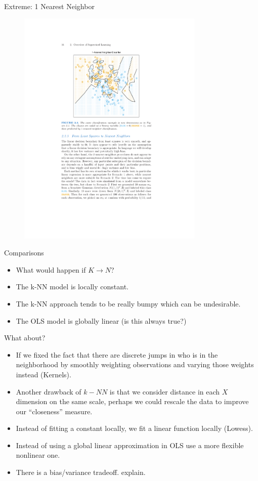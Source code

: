 \documentclass[11pt,handout,xcolor=pdftex,dvipsnames,table,mathserif]{beamer}
\begin{document}
\begin{frame}{Extreme: 1 Nearest Neighbor}
\begin{figure}[htbp]
\begin{center}
\includegraphics[width=3.5in]{./resources/classifier1nn.pdf}
\label{class15nn}
\end{center}
\end{figure}
\end{frame}

\begin{frame}{Comparisons}
\begin{itemize}
\item What would happen if $K \rightarrow N$?
\item The k-NN model is locally constant.
\item The k-NN approach tends to be really bumpy which can be undesirable.
\item The OLS model is globally linear (is this always true?)
\end{itemize}
\end{frame}
\begin{frame}{What about?}
\begin{itemize}
\item If we fixed the fact that there are discrete jumps in who is in the neighborhood by smoothly weighting observations and varying those weights instead (Kernels).
\item Another drawback of $k-NN$ is that we consider distance in each $X$ dimension on the same scale, perhaps we could rescale the data to improve our ``closeness'' measure.
\item Instead of fitting a constant locally, we fit a linear function locally (Lowess).
\item Instead of using a global linear approximation in OLS use a more flexible nonlinear one.
\item There is a bias/variance tradeoff. \alert{explain}.
\end{itemize}
\end{frame}
\end{document}
